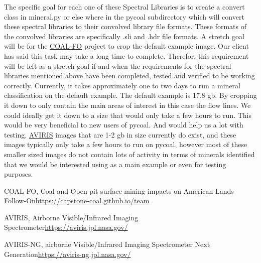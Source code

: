 \documentclass[a4paper,12pt]{article}
\begin{document}
\newline
The specific goal for each one of these Spectral Libraries is to create a convert class in mineral.py or else where in the pycoal subdirectory which will convert these spectral libraries to their convolved library file formats. These formats of the convolved libraries are specifically .sli and .hdr file formats.\newline
\newline
A stretch goal will be for the \href{https://capstone-coal.github.io/team}{COAL-FO} project to crop the default example image. Our client has said this task may take a long time to complete. Therefor, this requirement will be left as a stretch goal if and when the requirements for the spectral libraries mentioned above have been completed, tested and verified to be working correctly. \newline
\newline
Currently, it takes approximately one to two days to run a mineral classification on the default example. The default example is 17.8 gb. By cropping it down to only contain the main areas of interest in this case the flow lines. We could ideally get it down to a size that would only take a few hours to run. This would be very beneficial to new users of pycoal. And would help us a lot with testing. \href{https://aviris.jpl.nasa.gov/}{AVIRIS} images that are 1-2 gb in size currently do exist, and these images typically only take a few hours to run on pycoal, however most of these smaller sized images do not contain lots of activity in terms of minerals identified that we would be interested using as a main example or even for testing purposes. \newline

\newline

\noindent [1] COAL-FO, Coal and Open-pit surface mining impacts on American Lands Follow-On\newline \url{https://capstone-coal.github.io/team} \newline

\noindent [2] AVIRIS, Airborne Visible/Infrared Imaging Spectrometer\newline \url{https://aviris.jpl.nasa.gov/} \newline

\noindent [3] AVIRIS-NG, airborne Visible/Infrared Imaging Spectrometer Next Generation\newline \url{https://aviris-ng.jpl.nasa.gov/}\newline
\end{document}
